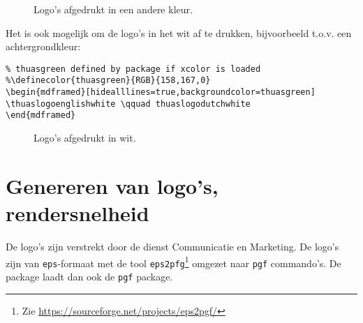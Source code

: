 \documentclass[a4paper,12pt]{article}
\begin{document}
\begin{figure}[H]
\centering
\makeatletter
{}%
\resizebox{0.9\textwidth}{!}{\thuaslogo@logoenglishnocolor \qquad \thuaslogo@logodutchnocolor}
\vskip20pt
%
\resizebox{0.9\textwidth}{!}{\thuaslogo@logoenglishnocolortis \qquad \thuaslogo@logodutchnocolortis}
\vskip20pt
%
\resizebox{0.9\textwidth}{!}{\thuaslogo@logoenglishnocolorbfm \qquad \thuaslogo@logodutchnocolorbfm}
\vskip20pt
%
\resizebox{0.9\textwidth}{!}{\thuaslogo@logoenglishnocoloritd \qquad \thuaslogo@logodutchnocoloritd}
\vskip20pt
%
\resizebox{0.9\textwidth}{!}{\thuaslogo@logoenglishnocolormo \qquad \thuaslogo@logodutchnocolormo}
\vskip20pt
%
\resizebox{0.9\textwidth}{!}{\thuaslogo@logoenglishnocolorswe \qquad \thuaslogo@logodutchnocolorswe}
\vskip20pt
%
\resizebox{0.9\textwidth}{!}{\thuaslogo@logoenglishnocolorpls \qquad \thuaslogo@logodutchnocolorbrv}
\makeatother
\caption{Logo's afgedrukt in een andere kleur.}
\end{figure}


Het is ook mogelijk om de logo's in het wit af te drukken, bijvoorbeeld t.o.v.
een achtergrondkleur:

\begin{verbatim}
% thuasgreen defined by package if xcolor is loaded
%\definecolor{thuasgreen}{RGB}{158,167,0}
\begin{mdframed}[hidealllines=true,backgroundcolor=thuasgreen]
\thuaslogoenglishwhite \qquad thuaslogodutchwhite
\end{mdframed}
\end{verbatim}

\begin{figure}[H]
\centering
\begin{mdframed}[hidealllines=true,backgroundcolor=thuasgreen]
\centering
\resizebox{0.9\textwidth}{!}{\thuaslogoenglishwhite \qquad \thuaslogodutchwhite}
\end{mdframed}
\caption{Logo's afgedrukt in wit.}
\end{figure}


\section{Genereren van logo's, rendersnelheid}
De logo's zijn verstrekt door de dienst Communicatie en Marketing. De logo's zijn van \verb|eps|-formaat
met de tool \verb|eps2pfg|\footnote{Zie \url{https://sourceforge.net/projects/eps2pgf/}} omgezet
naar \verb|pgf| commando's. De package laadt dan ook de \verb|pgf| package.
\end{document}
